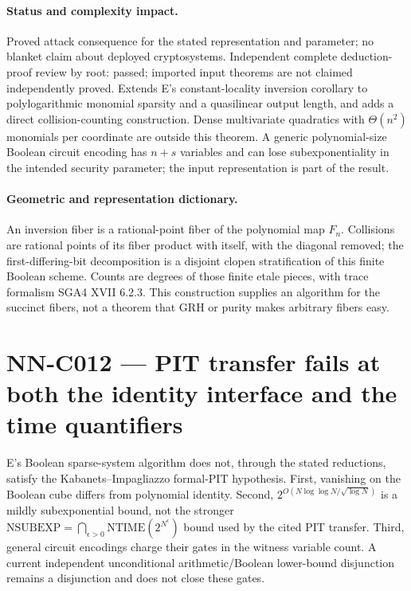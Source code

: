 \paragraph{Status and complexity impact.}
Proved attack consequence for the stated representation and parameter; no blanket claim about deployed cryptosystems. Independent complete deduction-proof review by root: passed; imported input theorems are not claimed independently proved. Extends E's constant-locality inversion corollary to polylogarithmic monomial sparsity and a quasilinear output length, and adds a direct collision-counting construction. Dense multivariate quadratics with $\Theta(n^2)$ monomials per coordinate are outside this theorem. A generic polynomial-size Boolean circuit encoding has $n+s$ variables and can lose subexponentiality in the intended security parameter; the input representation is part of the result.

\paragraph{Geometric and representation dictionary.}
An inversion fiber is a rational-point fiber of the polynomial map $F_n$. Collisions are rational points of its fiber product with itself, with the diagonal removed; the first-differing-bit decomposition is a disjoint clopen stratification of this finite Boolean scheme. Counts are degrees of those finite etale pieces, with trace formalism SGA4 XVII 6.2.3. This construction supplies an algorithm for the succinct fibers, not a theorem that GRH or purity makes arbitrary fibers easy.



\section{NN-C012 --- PIT transfer fails at both the identity interface and the time quantifiers}
\begin{proposition}[NN-C012]
E's Boolean sparse-system algorithm does not, through the stated reductions, satisfy the Kabanets--Impagliazzo formal-PIT hypothesis. First, vanishing on the Boolean cube differs from polynomial identity. Second, $2^{O(N\log\log N/\sqrt{\log N})}$ is a mildly subexponential bound, not the stronger $\mathrm{NSUBEXP}=\bigcap_{\epsilon>0}\mathrm{NTIME}(2^{N^\epsilon})$ bound used by the cited PIT transfer. Third, general circuit encodings charge their gates in the witness variable count. A current independent unconditional arithmetic/Boolean lower-bound disjunction remains a disjunction and does not close these gates.
\end{proposition}
